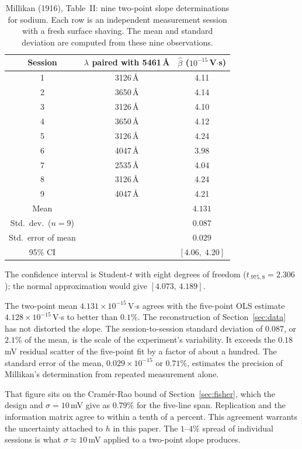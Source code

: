\documentclass[12pt]{article}
\begin{document}
\begin{table}[ht]
\centering
\caption{Millikan (1916), Table~II: nine two-point slope determinations
for sodium.  Each row is an independent measurement session with a fresh
surface shaving.  The mean and standard deviation are computed from these
nine observations.}
\label{tab:two_point}
\begin{tabular}{ccc}
\toprule
Session & $\lambda$ paired with 5461\,\AA & $\hat\beta$ ($10^{-15}$\,V$\cdot$s) \\
\midrule
1 & 3126\,\AA & 4.11 \\
2 & 3650\,\AA & 4.14 \\
3 & 3126\,\AA & 4.10 \\
4 & 3650\,\AA & 4.12 \\
5 & 3126\,\AA & 4.24 \\
6 & 4047\,\AA & 3.98 \\
7 & 2535\,\AA & 4.04 \\
8 & 3126\,\AA & 4.24 \\
9 & 4047\,\AA & 4.21 \\
\midrule
Mean   & & $\mathbf{4.131}$ \\
Std.~dev.\ ($n=9$) & & $0.087$ \\
Std.~error of mean & & $0.029$ \\
95\% CI & & $[4.06,\; 4.20]$ \\
\bottomrule
\end{tabular}
\end{table}

\noindent The confidence interval is Student-$t$ with eight degrees of
freedom ($t_{.975,8} = 2.306$); the normal approximation would give
$[4.073,\,4.189]$.

The two-point mean $4.131\times10^{-15}$\,V$\cdot$s agrees with the five-point
OLS estimate $4.128\times10^{-15}$\,V$\cdot$s to better than $0.1\%$.  The
reconstruction of Section~\ref{sec:data} has not distorted the slope.  The
session-to-session standard deviation of $0.087$, or $2.1\%$ of the mean, is
the scale of the experiment's variability.  It exceeds the $0.18$\,mV residual
scatter of the five-point fit by a factor of about a hundred.  The standard
error of the mean, $0.029\times10^{-15}$ or $0.71\%$, estimates the precision
of Millikan's determination from repeated measurement alone.

That figure sits on the Cram\'er-Rao bound of Section~\ref{sec:fisher}, which
the design and $\sigma = 10$\,mV give as $0.79\%$ for the five-line span.
Replication and the information matrix agree to within a tenth of a percent.
This agreement warrants the uncertainty attached to $h$ in this paper.  The
$1$--$4\%$ spread of individual sessions is what $\sigma\approx10$\,mV applied
to a two-point slope produces.
\end{document}
